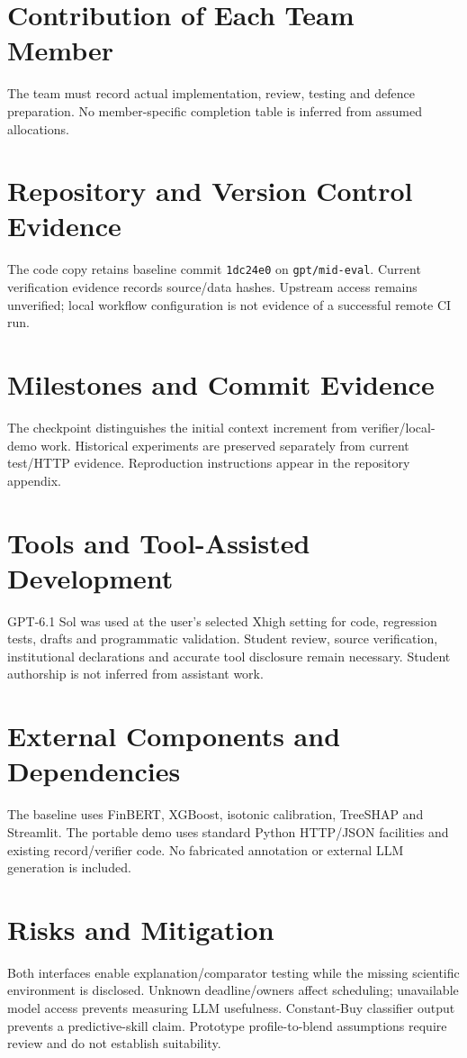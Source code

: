 \section{Contribution of Each Team Member}
The team must record actual implementation, review, testing and defence preparation. No member-specific completion table is inferred from assumed allocations.
\section{Repository and Version Control Evidence}
The code copy retains baseline commit \texttt{1dc24e0} on \texttt{gpt/mid-eval}. Current verification evidence records source/data hashes. Upstream access remains unverified; local workflow configuration is not evidence of a successful remote CI run.
\section{Milestones and Commit Evidence}
The checkpoint distinguishes the initial context increment from verifier/local-demo work. Historical experiments are preserved separately from current test/HTTP evidence. Reproduction instructions appear in the repository appendix.
\section{Tools and Tool-Assisted Development}
GPT-6.1 Sol was used at the user's selected Xhigh setting for code, regression tests, drafts and programmatic validation. Student review, source verification, institutional declarations and accurate tool disclosure remain necessary. Student authorship is not inferred from assistant work.
\section{External Components and Dependencies}
The baseline uses FinBERT, XGBoost, isotonic calibration, TreeSHAP and Streamlit. The portable demo uses standard Python HTTP/JSON facilities and existing record/verifier code. No fabricated annotation or external LLM generation is included.
\section{Risks and Mitigation}
Both interfaces enable explanation/comparator testing while the missing scientific environment is disclosed. Unknown deadline/owners affect scheduling; unavailable model access prevents measuring LLM usefulness. Constant-Buy classifier output prevents a predictive-skill claim. Prototype profile-to-blend assumptions require review and do not establish suitability.
